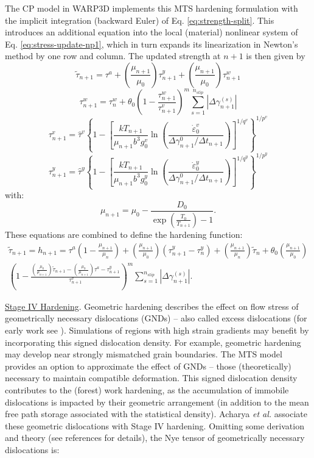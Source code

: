 \documentclass[11pt]{report}
\numberwithin{equation}{section}
\newcommand{\ul} {\underline}
\newcommand{\noi}{\noindent}
\begin{document}
The CP model in WARP3D implements this MTS hardening
formulation with the implicit integration (backward Euler) of Eq. \ref{eq:strength-split}.
This introduces an additional equation into the local (material) nonlinear
system of Eq. \ref{eq:stress-update-np1}, which in turn expands its linearization in Newton's method
by one row and column. The updated strength at $n+1$ is then given by
\[
\ensuremath{\tilde{\tau}_{n+1}=\tau^{a}+\left(\frac{\mu_{n+1}}{\mu_{0}}\right)\tau_{n+1}^{y}+\left(\frac{\mu_{n+1}}{\mu_{0}}\right)\tau_{n+1}^{w}}
\]
\[
\ensuremath{\tau_{n+1}^{w}=\tau_{n}^{w}+\theta_{0}\left(1-\frac{\tau_{n+1}^{w}}{\tau_{n+1}^{v}}\right)^{m}\sum\limits _{s=1}^{n_{slip}}\left|\Delta\gamma_{n+1}^{\left(s\right)}\right|}
\]
\[
\ensuremath{\tau_{n+1}^{v}=\hat{\tau}^{v}\left\{ 1-\left[\frac{kT_{n+1}}{\mu_{n+1}b^{3}g_{0}^{v}}\ln\left(\frac{\dot{\varepsilon}_{0}^{v}}{\Delta\gamma_{n+1}^{0}/\Delta t_{n+1}}\right)\right]^{1/q^{v}}\right\} ^{1/p^{v}}}
\]
\begin{equation}
\ensuremath{\tau_{n+1}^{y}=\hat{\tau}^{y}\left\{ 1-\left[\frac{kT_{n+1}}{\mu_{n+1}b^{3}g_{0}^{y}}\ln\left(\frac{\dot{\varepsilon}_{0}^{y}}{\Delta\gamma_{n+1}^{0}/\Delta t_{n+1}}\right)\right]^{1/q^{y}}\right\} ^{1/p^{y}}}\label{eq:tau_y}
\end{equation}
with:
\begin{equation}
\ensuremath{\mu_{n+1}=\mu_{0}-\frac{D_{0}}{\exp\left(\frac{T_{0}}{T_{n+1}}\right)-1}}.\label{eq:shear}
\end{equation}
These equations are combined to define the hardening function:
\begin{multline}
\ensuremath{\tilde{\tau}_{n+1}=h_{n+1}=\tau^{a}\left(1-\frac{\mu_{n+1}}{\mu_{n}}\right)+\left(\frac{\mu_{n+1}}{\mu_{0}}\right)\left(\tau_{n+1}^{y}-\tau_{n}^{y}\right)+\left(\frac{\mu_{n+1}}{\mu_{n}}\right)\tilde{\tau}_{n}+\theta_{0}\left(\frac{\mu_{n+1}}{\mu_{0}}\right)}\\
\ensuremath{\left(1-\frac{\left(\frac{\mu_{0}}{\mu_{n+1}}\right)\tilde{\tau}_{n+1}-\left(\frac{\mu_{0}}{\mu_{n+1}}\right)\tau^{a}-\tau_{n+1}^{y}}{\tau_{n+1}^{v}}\right)^{m}\ensuremath{\sum\limits _{s=1}^{n_{slip}}\left|\Delta\gamma_{n+1}^{\left(s\right)}\right|.}}
\end{multline}


\noi \ul{Stage IV Hardening}. 
Geometric hardening describes the effect on flow stress of geometrically 
necessary dislocations (GNDs) -- 
also called excess dislocations  (for early work see \cite{A70}). 
Simulations of regions with high strain gradients may benefit by  incorporating this signed 
dislocation density. For example, geometric hardening may develop
near strongly mismatched grain boundaries. The MTS model provides an option to approximate
the effect of GNDs -- those (theoretically) necessary to maintain
compatible deformation.  This signed dislocation density
contributes to the (forest) work hardening, as the accumulation of 
immobile dislocations is impacted by their geometric arrangement 
(in addition to the mean free path storage associated with the statistical 
density). Acharya \emph{et al.} \cite{ABB03}
associate these geometric dislocations with 
Stage IV hardening. Omitting some derivation and theory (see references for
details), the Nye tensor of geometrically necessary dislocations
is:
\end{document}
